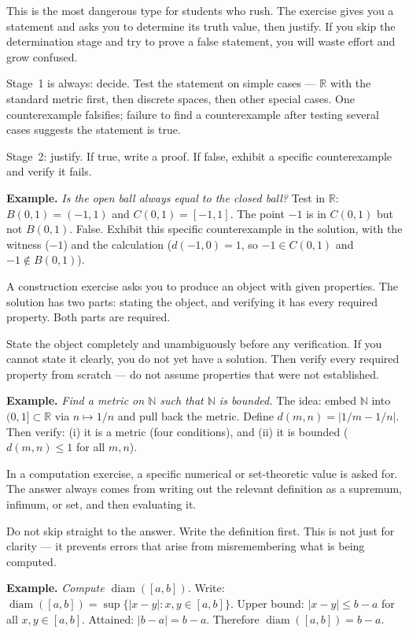 \begin{remark}
This is the most dangerous type for students who rush. The exercise
gives you a statement and asks you to determine its truth value, then
justify. If you skip the determination stage and try to prove a false
statement, you will waste effort and grow confused.

Stage~1 is always: decide. Test the statement on simple cases ---
$\mathbb{R}$ with the standard metric first, then discrete spaces,
then other special cases. One counterexample falsifies; failure to
find a counterexample after testing several cases suggests the
statement is true.

Stage~2: justify. If true, write a proof. If false, exhibit a specific
counterexample and verify it fails.

\textbf{Example.} \textit{Is the open ball always equal to the closed ball?}
Test in $\mathbb{R}$: $B(0,1) = (-1,1)$ and $C(0,1) = [-1,1]$.
The point $-1$ is in $C(0,1)$ but not $B(0,1)$. False. Exhibit this
specific counterexample in the solution, with the witness ($-1$) and
the calculation ($d(-1,0) = 1$, so $-1 \in C(0,1)$ and $-1 \notin B(0,1)$).
\end{remark}

\begin{remark}
A construction exercise asks you to produce an object with given
properties. The solution has two parts: stating the object, and
verifying it has every required property. Both parts are required.

State the object completely and unambiguously before any verification.
If you cannot state it clearly, you do not yet have a solution.
Then verify every required property from scratch --- do not assume
properties that were not established.

\textbf{Example.} \textit{Find a metric on $\mathbb{N}$ such that
$\mathbb{N}$ is bounded.} The idea: embed $\mathbb{N}$ into
$(0,1] \subset \mathbb{R}$ via $n \mapsto 1/n$ and pull back the metric.
Define $d(m,n) = |1/m - 1/n|$. Then verify: (i) it is a metric (four
conditions), and (ii) it is bounded ($d(m,n) \leq 1$ for all $m,n$).
\end{remark}

\begin{remark}
In a computation exercise, a specific numerical or set-theoretic value
is asked for. The answer always comes from writing out the relevant
definition as a supremum, infimum, or set, and then evaluating it.

Do not skip straight to the answer. Write the definition first.
This is not just for clarity --- it prevents errors that arise from
misremembering what is being computed.

\textbf{Example.} \textit{Compute $\operatorname{diam}([a,b])$.}
Write: $\operatorname{diam}([a,b]) = \sup\{|x-y| : x, y \in [a,b]\}$.
Upper bound: $|x-y| \leq b-a$ for all $x,y \in [a,b]$.
Attained: $|b - a| = b-a$. Therefore $\operatorname{diam}([a,b]) = b-a$.
\end{remark}

